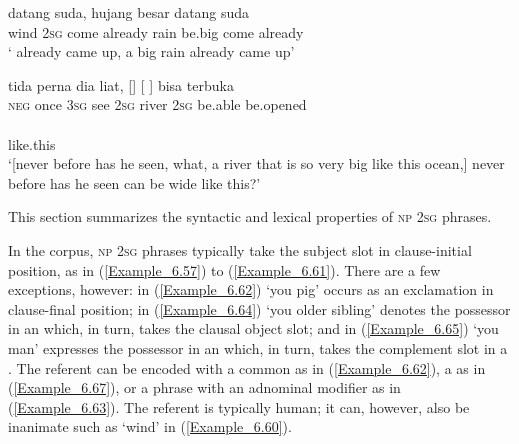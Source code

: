 \ea
\label{Example_6.60}
\gll {\ldots} {} {} {datang} {suda,} {hujang} {besar} {datang} {suda}\\ %
  { } wind  \textsc{2sg}  come  already  rain  be.big  come  already\\

 ‘ already came up, a big rain already came up’ \textstyleExampleSource{[080917-008-NP.0137]}
\z

\ea
\label{Example_6.61}
\gll {\ldots} {tida} {perna} {dia} {liat,} {[]} {[} {]} {bisa} {terbuka}\\ %
{  }   \textsc{neg}  once  \textsc{3sg}  see  \textsc{2sg}  river  \textsc{2sg}  be.able  be.opened\\
\\
 {like.this}\\
 ‘[never before has he seen, what, a river that is so very big like this ocean,] never before has he seen  can be wide like this?’ \textstyleExampleSource{[080922-010a-CvNF.0212-0213]}
\z



This section summarizes the syntactic and lexical properties of \textsc{np} \textsc{2sg}  phrases.



In the corpus, \textsc{np} \textsc{2sg}  phrases typically take the subject slot in clause-initial position, as in (\ref{Example_6.57}) to (\ref{Example_6.61}). There are a few exceptions, however: in (\ref{Example_6.62})  ‘you pig’ occurs as an exclamation in clause-final position; in (\ref{Example_6.64})  ‘you older sibling’ denotes the possessor in an  which, in turn, takes the clausal object slot; and in (\ref{Example_6.65})  ‘you man’ expresses the possessor in an  which, in turn, takes the complement slot in a . The referent can be encoded with a common  as in (\ref{Example_6.62}), a  as in (\ref{Example_6.67}), or a  phrase with an adnominal modifier as in (\ref{Example_6.63}). The referent is typically human; it can, however, also be inanimate such as  ‘wind’ in (\ref{Example_6.60}).



